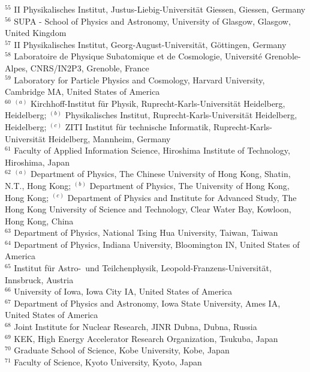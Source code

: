 \begin{flushleft}
$^{55}$ II Physikalisches Institut, Justus-Liebig-Universit{\"a}t Giessen, Giessen, Germany\\
$^{56}$ SUPA - School of Physics and Astronomy, University of Glasgow, Glasgow, United Kingdom\\
$^{57}$ II Physikalisches Institut, Georg-August-Universit{\"a}t, G{\"o}ttingen, Germany\\
$^{58}$ Laboratoire de Physique Subatomique et de Cosmologie, Universit{\'e} Grenoble-Alpes, CNRS/IN2P3, Grenoble, France\\
$^{59}$ Laboratory for Particle Physics and Cosmology, Harvard University, Cambridge MA, United States of America\\
$^{60}$ $^{(a)}$ Kirchhoff-Institut f{\"u}r Physik, Ruprecht-Karls-Universit{\"a}t Heidelberg, Heidelberg; $^{(b)}$ Physikalisches Institut, Ruprecht-Karls-Universit{\"a}t Heidelberg, Heidelberg; $^{(c)}$ ZITI Institut f{\"u}r technische Informatik, Ruprecht-Karls-Universit{\"a}t Heidelberg, Mannheim, Germany\\
$^{61}$ Faculty of Applied Information Science, Hiroshima Institute of Technology, Hiroshima, Japan\\
$^{62}$ $^{(a)}$ Department of Physics, The Chinese University of Hong Kong, Shatin, N.T., Hong Kong; $^{(b)}$ Department of Physics, The University of Hong Kong, Hong Kong; $^{(c)}$ Department of Physics and Institute for Advanced Study, The Hong Kong University of Science and Technology, Clear Water Bay, Kowloon, Hong Kong, China\\
$^{63}$ Department of Physics, National Tsing Hua University, Taiwan, Taiwan\\
$^{64}$ Department of Physics, Indiana University, Bloomington IN, United States of America\\
$^{65}$ Institut f{\"u}r Astro-{~}und Teilchenphysik, Leopold-Franzens-Universit{\"a}t, Innsbruck, Austria\\
$^{66}$ University of Iowa, Iowa City IA, United States of America\\
$^{67}$ Department of Physics and Astronomy, Iowa State University, Ames IA, United States of America\\
$^{68}$ Joint Institute for Nuclear Research, JINR Dubna, Dubna, Russia\\
$^{69}$ KEK, High Energy Accelerator Research Organization, Tsukuba, Japan\\
$^{70}$ Graduate School of Science, Kobe University, Kobe, Japan\\
$^{71}$ Faculty of Science, Kyoto University, Kyoto, Japan\\

\end{flushleft}
